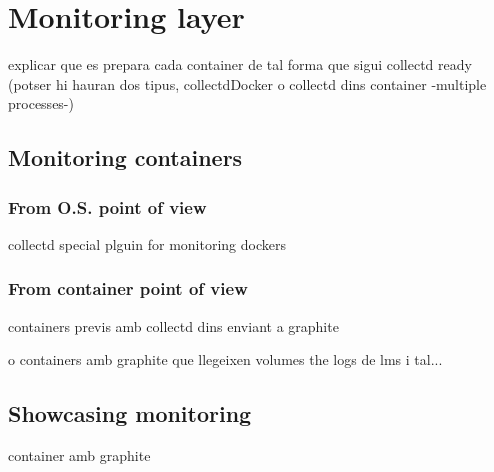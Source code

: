 \chapter{Monitoring layer}\label{G:monitoringLayer}
explicar que es prepara cada container de tal forma que sigui collectd ready (potser hi hauran dos tipus, collectdDocker o collectd dins container -multiple processes-)

\section{Monitoring containers}

\subsection{From O.S. point of view}
collectd special plguin for monitoring dockers

\subsection{From container point of view}

containers previs amb collectd dins enviant a graphite

o containers amb graphite que llegeixen volumes the logs de lms i tal...

\section{Showcasing monitoring}

container amb graphite